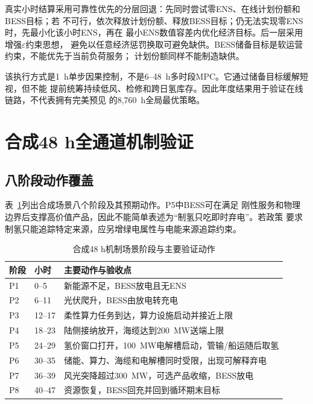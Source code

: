 真实小时结算采用可靠性优先的分层回退：先同时尝试零ENS、在线计划份额和BESS目标；若
不可行，依次释放计划份额、释放BESS目标；仍无法实现零ENS时，先最小化该小时ENS，再在
最小ENS数值容差内优化经济目标。后一层采用增强$\varepsilon$约束思想\cite{mavrotas2009}，
避免以任意经济惩罚换取可避免缺供。BESS储备目标是软运营约束，不能优先于当前负荷服务；
计划份额同样不能制造缺供。

该执行方式是1~h单步因果控制，不是6--48~h多时段MPC。它通过储备目标缓解短视，但不能
提前统筹持续低风、检修和跨日氢库存。因此年度结果用于验证在线链路，不代表拥有完美预见
的8,760~h全局最优策略。

\section{合成48 h全通道机制验证}

\subsection{八阶段动作覆盖}

表~\ref{tab:c5-mechanism-phases}列出合成场景八个阶段及其预期动作。P5中BESS可在满足
刚性服务和物理边界后支撑高价值产品，因此不能简单表述为“制氢只吃即时弃电”。若政策
要求制氢只能追踪特定来源，应另增绿电属性与电能来源追踪约束。

\begin{table}[htbp]
\centering
\caption{合成48 h机制场景阶段与主要验证动作}
\label{tab:c5-mechanism-phases}
\begin{tabularx}{\textwidth}{p{1.3cm}p{2.2cm}X}
\toprule
阶段 & 小时 & 主要动作与验收点\\
\midrule
P1 & 0--5 & 新能源不足，BESS放电且无ENS\\
P2 & 6--11 & 光伏爬升，BESS由放电转充电\\
P3 & 12--17 & 柔性算力任务到达，算力设施启动并接近上限\\
P4 & 18--23 & 陆侧接纳放开，海缆达到200~MW送端上限\\
P5 & 24--29 & 氢价窗口打开，100~MW电解槽启动，管输/船运随后取氢\\
P6 & 30--35 & 储能、算力、海缆和电解槽同时受限，出现可解释弃电\\
P7 & 36--39 & 风光突降超过300~MW，可选产品收缩，BESS放电\\
P8 & 40--47 & 资源恢复，BESS回充并回到循环期末目标\\
\bottomrule
\end{tabularx}
\end{table}

